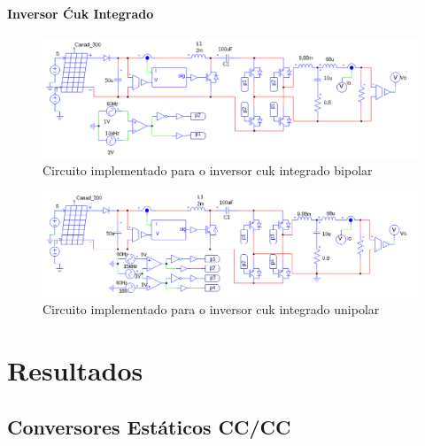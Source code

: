 \documentclass[
	12pt,				%
	openany,
	onseside,
	a4paper,			%
	english,			%
	french,				%
	spanish,			%
	brazil,				%
	]{abntex2}
\begin{document}
\subsubsection{Inversor Ćuk Integrado}
\begin{figure}[H]%
	\captionsetup{justification=centering}
	\centering
		\includegraphics[width= \linewidth]{comp_integ_circ_clean}
		\caption{Circuito implementado para o inversor cuk integrado bipolar}
		\label{fig:comp_integ_circ_clean}
\end{figure}
\begin{figure}[H]%
	\captionsetup{justification=centering}
	\centering
		\includegraphics[width= \linewidth]{comp_integ_circ_clean_unip}
		\caption{Circuito implementado para o inversor cuk integrado unipolar}
		\label{fig:comp_integ_circ_clean_unip}
\end{figure}

\chapter{Resultados}

\section{Conversores Estáticos CC/CC}
\end{document}
